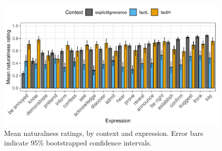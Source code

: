 \documentclass[11pt,fleqn]{article}
\newcommand{\6}{\mbox{$[\hspace*{-.6mm}[$}}
\newcommand{\9}{\mbox{$]\hspace*{-.6mm}]$}}
\begin{document}
\begin{figure}[h!]
\centering
\includegraphics[width=\textwidth]{../../results/main/13explicitIgnorance/graphs/naturalness-by-context-and-predicate}
\caption{Mean naturalness ratings, by context and expression. Error bars indicate 95\% bootstrapped confidence intervals.}\label{fig:}
\end{figure}
\end{document}
